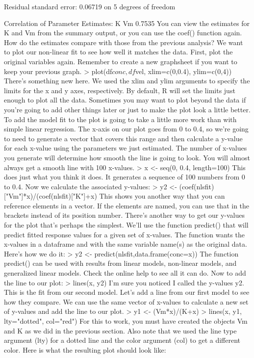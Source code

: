 Residual standard error: 0.06719 on 5 degrees of freedom

Correlation of Parameter Estimates:
        K
Vm 0.7535 
You can view the estimates for K and Vm from the summary output, or you can use the coef() function again. How do the estimates compare with those from the previous analysis? We want to plot our non-linear fit to see how well it matches the data. First, plot the original variables again. Remember to create a new graphsheet if you want to keep your previous graph. 
> plot(df$conc, df$vel, xlim=c(0,0.4), ylim=c(0,4))
There's something new here. We used the xlim and ylim arguments to specify the limits for the x and y axes, respectively. By default, R will set the limits just enough to plot all the data. Sometimes you may want to plot beyond the data if you're going to add other things later or just to make the plot look a little better. 
To add the model fit to the plot is going to take a little more work than with simple linear regression. The x-axis on our plot goes from 0 to 0.4, so we're going to need to generate a vector that covers this range and then calculate a y-value for each x-value using the parameters we just estimated. The number of x-values you generate will determine how smooth the line is going to look. You will almost always get a smooth line with 100 x-values. 
> x <- seq(0, 0.4, length=100)
This does just what you think it does. It generates a sequence of 100 numbers from 0 to 0.4. Now we calculate the associated y-values: 
> y2 <- (coef(nlsfit)["Vm"]*x)/(coef(nlsfit)["K"]+x)
This shows you another way that you can reference elements in a vector. If the elements are named, you can use that in the brackets instead of its position number. There's another way to get our y-values for the plot that's perhaps the simplest. We'll use the function predict() that will predict fitted response values for a given set of x-values. The function wants the x-values in a dataframe and with the same variable name(s) as the original data. Here's how we do it: 
> y2 <- predict(nlsfit,data.frame(conc=x))
The function predict() can be used with results from linear models, non-linear models, and generalized linear models. Check the online help to see all it can do. Now to add the line to our plot: 
> lines(x, y2)
I'm sure you noticed I called the y-values y2. This is the fit from our second model. Let's add a line from our first model to see how they compare. We can use the same vector of x-values to calculate a new set of y-values and add the line to our plot. 
> y1 <- (Vm*x)/(K+x)
> lines(x, y1, lty="dotted", col="red")
For this to work, you must have created the objects Vm and K as we did in the previous section. Also note that we used the line type argument (lty) for a dotted line and the color argument (col) to get a different color. Here is what the resulting plot should look like: 


